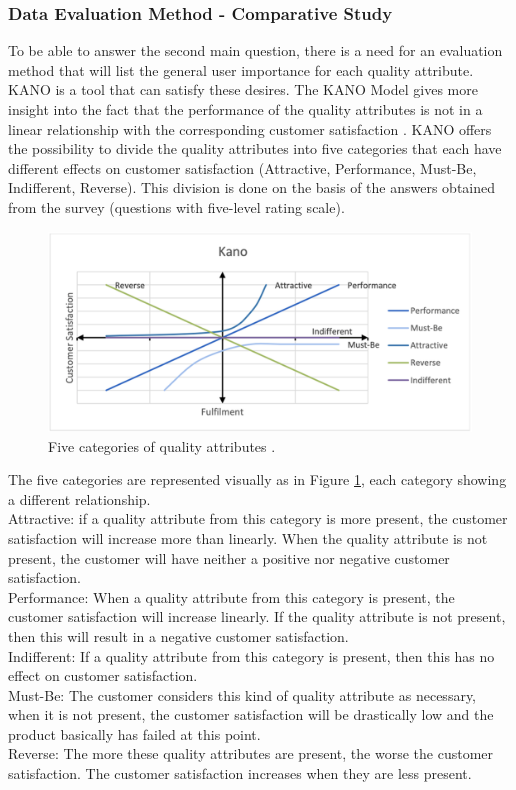 \subsubsection{Data Evaluation Method - Comparative Study}
To be able to answer the second main question, there is a need for an evaluation method that will list the general user importance for each quality attribute. KANO is a tool that can satisfy these desires. The KANO Model gives more insight into the fact that the performance of the quality attributes is not in a linear relationship with the corresponding customer satisfaction \citep{KANO1984}. KANO offers the possibility to divide the quality attributes into five categories that each have different effects on customer satisfaction (Attractive, Performance, Must-Be, Indifferent, Reverse). This division is done on the basis of the answers obtained from the survey (questions with five-level rating scale).\\

\begin{figure}[ht]
	\includegraphics[scale=0.35]{../LaTeX/Figures/KANO.png}
	\caption{Five categories of quality attributes \citep{KANO1984}.}
	\label{fig:kano}
\end{figure}
\break
The five categories are represented visually as in Figure \ref{fig:kano}, each category showing a different relationship.\\
\break
Attractive: if a quality attribute from this category is more present, the customer satisfaction will increase more than linearly. When the quality attribute is not present, the customer will have neither a positive nor negative customer satisfaction.\\
\break
Performance: When a quality attribute from this category is present, the customer satisfaction will increase linearly. If the quality attribute is not present, then this will result in a negative customer satisfaction.\\
\break
Indifferent: If a quality attribute from this category is present, then this has no effect on customer satisfaction.\\
\break
Must-Be: The customer considers this kind of quality attribute as necessary, when it is not present, the customer satisfaction will be drastically low and the product basically has failed at this point.\\
\break
Reverse: The more these quality attributes are present, the worse the customer satisfaction. The customer satisfaction increases when they are less present.

